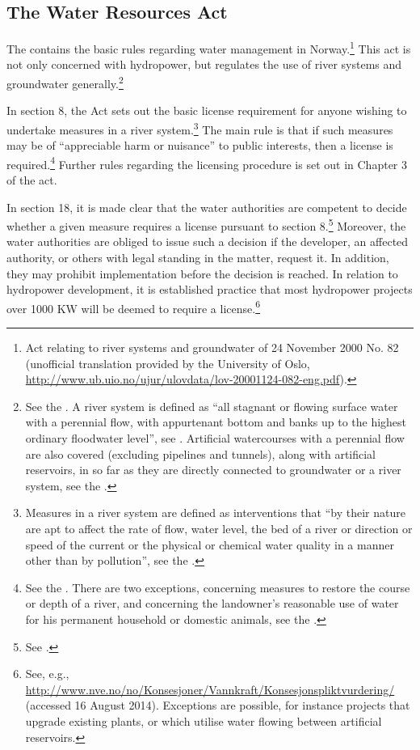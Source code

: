 \subsection{The Water Resources Act}\label{sec:wra00}

The \cite{wra00} contains the basic rules regarding water management in Norway.\footnote{Act relating to river systems and groundwater of 24 November 2000 No. 82 (unofficial translation provided by the University of Oslo, \url{http://www.ub.uio.no/ujur/ulovdata/lov-20001124-082-eng.pdf}).} This act is not only concerned with hydropower, but regulates the use of river systems and groundwater generally.\footnote{See the \cite[1]{wra00}. A river system is defined as ``all stagnant or flowing surface water with a perennial flow, with appurtenant bottom and banks up to the highest ordinary floodwater level'', see \cite[2]{wra00}. Artificial watercourses with a perennial flow are also covered (excluding pipelines and tunnels), along with artificial reservoirs, in so far as they are directly connected to groundwater or a river system, see the \cite[2a-2b]{wra00}.} 

In section 8, the Act sets out the basic license requirement for anyone wishing to undertake measures in a river system.\footnote{Measures in a river system are defined as interventions that ``by their nature are apt to affect the rate of flow, water level, the bed of a river or direction or speed of the current or the physical or chemical water quality in a manner other than by pollution'', see the \cite[3a]{wra00}.} The main rule is that if such measures may be of ``appreciable harm or nuisance''  to public interests, then a license is required.\footnote{See the \cite[8]{wra00}. There are two exceptions, concerning measures to restore the course or depth of a river, and concerning the landowner's reasonable use of water for his permanent household or domestic animals, see the \cite[12|15]{wra00}.} Further rules regarding the licensing procedure is set out in Chapter 3 of the act.

In section 18, it is made clear that the water authorities are competent to decide whether a given measure requires a license pursuant to section 8.\footnote{See \cite[18]{wra00}.}  Moreover, the water authorities are obliged to issue such a decision if the developer, an affected authority, or others with legal standing in the matter, request it. In addition, they may prohibit implementation before the decision is reached. In relation to hydropower development, it is established practice that most hydropower projects over 1000 KW will be deemed to require a license.\footnote{See, e.g., \url{http://www.nve.no/no/Konsesjoner/Vannkraft/Konsesjonspliktvurdering/} (accessed 16 August 2014). Exceptions are possible, for instance projects that upgrade existing plants, or which utilise water flowing between artificial reservoirs.}

